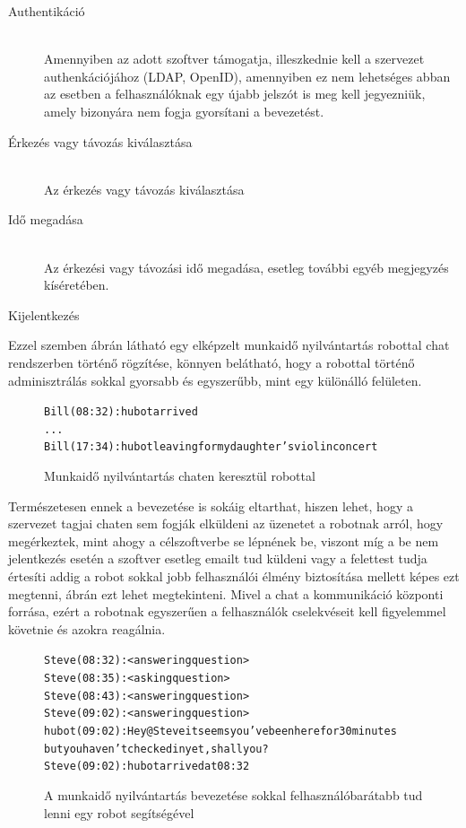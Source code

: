 \begin{description}
  \item[Authentikáció]\hfill\\
  Amennyiben az adott szoftver támogatja, illeszkednie kell a szervezet authenkációjához (LDAP, OpenID), amennyiben ez nem lehetséges abban az esetben a felhasználóknak egy újabb jelszót is meg kell jegyezniük, amely bizonyára nem fogja gyorsítani a bevezetést.
  \item[Érkezés vagy távozás kiválasztása]\hfill\\
  Az érkezés vagy távozás kiválasztása
  \item[Idő megadása]\hfill\\
  Az érkezési vagy távozási idő megadása, esetleg további egyéb megjegyzés kíséretében.
  \item[Kijelentkezés]
\end{description}

Ezzel szemben  ábrán látható egy elképzelt munkaidő nyilvántartás robottal chat rendszerben történő rögzítése, könnyen belátható, hogy a robottal történő adminisztrálás sokkal gyorsabb és egyszerűbb, mint egy különálló felületen.

\begin{figure}
  \begin{alltt}
Bill (08:32): hubot arrived
...
Bill (17:34): hubot leaving for my daughter's violin concert
  \end{alltt}
  \caption[DUMMY]%
    {Munkaidő nyilvántartás chaten keresztül robottal}%
    \label{lst:workhour_with_hubot}
\end{figure}

Természetesen ennek a bevezetése is sokáig eltarthat, hiszen lehet, hogy a szervezet tagjai chaten sem fogják elküldeni az üzenetet a robotnak arról, hogy megérkeztek, mint ahogy a célszoftverbe se lépnének be, viszont míg a be nem jelentkezés esetén a szoftver esetleg emailt tud küldeni vagy a felettest tudja értesíti addig a robot sokkal jobb felhasználói élmény biztosítása mellett képes ezt megtenni,  ábrán ezt lehet megtekinteni. Mivel a chat a kommunikáció központi forrása, ezért a robotnak egyszerűen a felhasználók cselekvéseit kell figyelemmel követnie és azokra reagálnia.

\begin{figure}
  \begin{alltt}
Steve (08:32): <answering question>
Steve (08:35): <asking question>
Steve (08:43): <answering question>
Steve (09:02): <answering question>
hubot (09:02): Hey @Steve it seems you've been here for 30 minutes
               but you haven't checked in yet, shall you?
Steve (09:02): hubot arrived at 08:32
    \end{alltt}
    \caption[DUMMY]%
    {A munkaidő nyilvántartás bevezetése sokkal felhasználóbarátabb tud lenni egy robot segítségével}%
    \label{lst:workhour_with_hubot_ux}
\end{figure}

